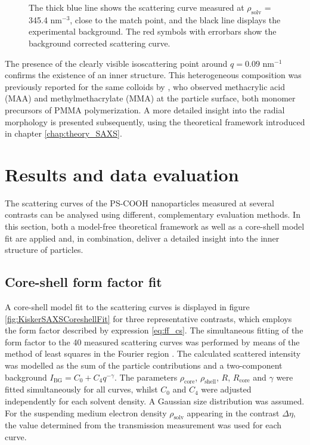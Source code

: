 \begin{figure}%
	\centering
		
		\caption[Background subtraction of the PS-COOH scattering curves.]{The thick blue line shows the scattering curve measured at $\rho_{\text{solv}}$ = 345.4 nm$^{-3}$, close to the match point, and the black line displays the experimental background. The red symbols with errorbars show the background corrected scattering curve.}
		\label{fig:KiskerBackgroundSubtraction}
\end{figure}

The presence of the clearly visible isoscattering point around \(q=0.09\) nm\(^{-1}\) confirms the existence of an inner structure. This heterogeneous composition was previously reported for the same colloids by \citet{minelli_characterization_2014}, who observed methacrylic acid (MAA) and methylmethacrylate (MMA) at the particle surface, both monomer precursors of PMMA polymerization. A more detailed insight into the radial morphology is presented subsequently, using the theoretical framework introduced in chapter \ref{chap:theory_SAXS}.

\section{Results and data evaluation}
\label{sec:KiskerResultsEvaluation}

The scattering curves of the PS-COOH nanoparticles measured at several contrasts can be analysed using different, complementary evaluation methods. In this section, both a model-free theoretical framework as well as a core-shell model fit are applied and, in combination, deliver a detailed insight into the inner structure of particles.


\subsection{Core-shell form factor fit}
\label{sec:coreshell_fit}
A core-shell model fit to the scattering curves is displayed in figure \ref{fig:KiskerSAXSCoreshellFit} for three representative contrasts, which employs the form factor described by expression \ref{eq:ff_cs}. The simultaneous fitting of the form factor to the 40 measured scattering curves was performed by means of the method of least squares in the Fourier region \citep{pedersen_analysis_1997}. The calculated scattered intensity was modelled as the sum of the particle contributions and a two-component background \(I_{\text{BG}}=C_0+C_4q^{-\gamma} \). The parameters \(\rho_{\text{core}}\), \(\rho_{\text{shell}}\), \(R\), \(R_{\text{core}}\) and \(\gamma\) were fitted simultaneously for all curves, whilst \( C_0 \) and \( C_4 \) were adjusted independently for each solvent density. A Gaussian size distribution was assumed. For the suspending medium electron density \( \rho_{\text{solv}} \) appearing in the contrast \( \Delta\eta \), the value determined from the transmission measurement was used for each curve.

